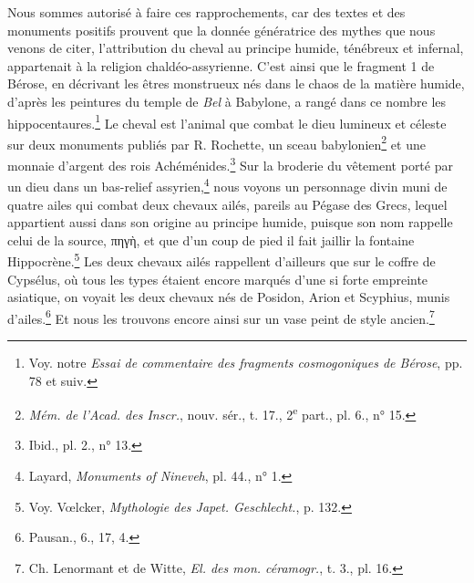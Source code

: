 \documentclass[a4paper, 11pt, oneside, landscape]{article}
\begin{document}
Nous sommes autorisé à faire ces rapprochements, car des textes et des monuments positifs prouvent que la donnée génératrice des mythes que nous venons de citer, l'attribution du cheval au principe humide, ténébreux et infernal, appartenait à la religion chaldéo-assyrienne. C'est ainsi que le fragment 1 de Bérose, en décrivant les êtres monstrueux nés dans le chaos de la matière humide, d'après les peintures du temple de \emph{Bel} à Babylone, a rangé dans ce nombre les hippocentaures.\footnote{Voy. notre \emph{Essai de commentaire des fragments cosmogoniques de Bérose}, pp. 78 et suiv.} Le cheval est l'animal que combat le dieu lumineux et céleste sur deux monuments publiés par R. Rochette, un sceau babylonien\footnote{\emph{Mém. de l'Acad. des Inscr.}, nouv. sér., t. 17., 2\textsuperscript{e} part., pl. 6., n° 15.} et une monnaie d'argent des rois Achéménides.\footnote{Ibid., pl. 2., n° 13.} Sur la broderie du vêtement porté par un dieu dans un bas-relief assyrien,\footnote{Layard, \emph{Monuments of Nineveh}, pl. 44., n° 1.} nous voyons un personnage divin muni de quatre ailes qui combat deux chevaux ailés, pareils au Pégase des Grecs, lequel appartient aussi dans son origine au principe humide, puisque son nom rappelle celui de la source, πηγὴ, et que d'un coup de pied il fait jaillir la fontaine Hippocrène.\footnote{Voy. Vœlcker, \emph{Mythologie des Japet. Geschlecht.}, p. 132.} Les deux chevaux ailés rappellent d'ailleurs que sur le coffre de Cypsélus, où tous les types étaient encore marqués d'une si forte empreinte asiatique, on voyait les deux chevaux nés de Posidon, Arion et Scyphius, munis d'ailes.\footnote{Pausan., 6., 17, 4.} Et nous les trouvons encore ainsi sur un vase peint de style ancien.\footnote{Ch. Lenormant et de Witte, \emph{El. des mon. céramogr.}, t. 3., pl. 16.}
\end{document}
